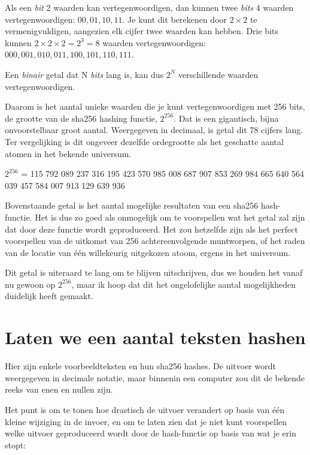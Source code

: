 \documentclass[smalldemyvopaper,11pt,twoside,onecolumn,openright,extrafontsizes]{memoir}
\begin{document}
Als een \textit{bit} 2 waarden kan vertegenwoordigen, dan kunnen twee \textit{bits} 4 waarden vertegenwoordigen: $00, 01, 10, 11$. Je kunt dit berekenen door $2 \times 2$ te vermenigvuldigen, aangezien elk cijfer twee waarden kan hebben. Drie bits kunnen $2 \times 2 \times 2 = 2^3 = 8$ waarden vertegenwoordigen:  $000, 001, 010, 011, 100, 101, 110, 111$.

Een \textit{binair} getal dat N \textit{bits} lang is, kan dus $2^N$ verschillende waarden vertegenwoordigen.

Daarom is het aantal unieke waarden die je kunt vertegenwoordigen met 256 bits, de grootte van de sha256 hashing functie, $2^{256}$. Dat is een gigantisch, bijna onvoorstelbaar groot aantal. Weergegeven in decimaal, is getal dit 78 cijfers lang. Ter vergelijking is dit ongeveer dezelfde ordegrootte als het geschatte aantal atomen in het bekende universum.

  \vspace{\baselineskip}
$2^{256}$ = 115 792 089 237 316 195 423 570 985 008 687 907 853 269 984 665 640 564 039 457 584 007 913 129 639 936
\vspace{\baselineskip} 


Bovenstaande getal is het aantal mogelijke resultaten van een sha256 hash-functie. Het is dus zo goed als onmogelijk om te voorspellen wat het getal zal zijn dat door deze functie wordt geproduceerd. Het zou hetzelfde zijn als het perfect voorspellen van de uitkomst van 256 achtereenvolgende muntworpen, of het raden van de locatie van één willekeurig uitgekozen atoom, ergens in het universum.

Dit getal is uiteraard te lang om te blijven uitschrijven, dus we houden het vanaf nu gewoon op $2^{256}$, maar ik hoop dat dit het ongelofelijke aantal mogelijkheden duidelijk heeft gemaakt.


\section{Laten we een aantal teksten hashen}

Hier zijn enkele voorbeeldteksten en hun sha256 hashes. De uitvoer wordt weergegeven in decimale notatie, maar binnenin een computer zou dit de bekende reeks van enen en nullen zijn.

Het punt is om te tonen hoe drastisch de uitvoer verandert op basis van één kleine wijziging in de invoer, en om te laten zien dat je niet kunt voorspellen welke uitvoer geproduceerd wordt door de hash-functie op basis van wat je erin stopt:
\end{document}
